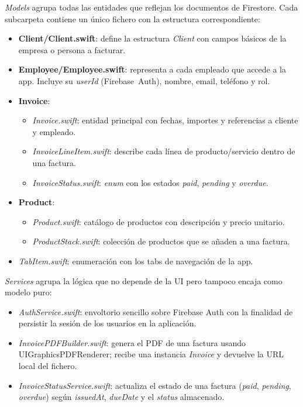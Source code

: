 \begin{large}
\textit{Models} agrupa todas las entidades que reflejan los documentos de Firestore. Cada subcarpeta contiene un único fichero con la estructura correspondiente:
\begin{itemize}
  \item \textbf{Client/Client.swift}: define la estructura \textit{Client} con campos básicos de la empresa o persona a facturar.
  \item \textbf{Employee/Employee.swift}: representa a cada empleado que accede a la app. Incluye su \textit{userId} (Firebase Auth), nombre, email, teléfono y rol.
  \item \textbf{Invoice}:
    \begin{itemize}
      \item \textit{Invoice.swift}: entidad principal con fechas, importes y referencias a cliente y empleado.
      \item \textit{InvoiceLineItem.swift}: describe cada línea de producto/servicio dentro de una factura.
      \item \textit{InvoiceStatus.swift}: \textit{enum} con los estados \textit{paid}, \textit{pending} y \textit{overdue}.
    \end{itemize}
  \item \textbf{Product}:
    \begin{itemize}
      \item \textit{Product.swift}: catálogo de productos con descripción y precio unitario.
      \item \textit{ProductStack.swift}: colección de productos que se añaden a una factura.
    \end{itemize}
  \item \textit{TabItem.swift}: enumeración con los tabs de navegación de la app.
\end{itemize}

\textit{Services} agrupa la lógica que no depende de la UI pero tampoco encaja como modelo puro:
\begin{itemize}
  \item \textit{AuthService.swift}: envoltorio sencillo sobre Firebase Auth con la finalidad de persistir la sesión de los usuarios en la aplicación.
  \item \textit{InvoicePDFBuilder.swift}: genera el PDF de una factura usando UIGraphicsPDFRenderer; recibe una instancia \textit{Invoice} y devuelve la URL local del fichero.
  \item \textit{InvoiceStatusService.swift}: actualiza el estado de una factura (\textit{paid}, \textit{pending}, \textit{overdue}) según \textit{issuedAt}, \textit{dueDate} y el \textit{status} almacenado.
\end{itemize}


\end{large}
